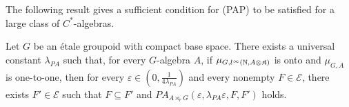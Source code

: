 
The following result gives a sufficient condition for (PAP) to be satisfied for a large class of $C^*$-algebras.

\begin{thm} \label{PAPG}
Let $G$ be an étale groupoid with compact base space. There exists a universal constant $\lambda_{PA}$ such that, for every $G$-algebra $A$, if $\mu_{G,l^\infty(\mathbb N, A\otimes\mathfrak K)}$ is onto and $\mu_{G,A}$ is one-to-one, then for every $\varepsilon \in(0,\frac{1}{4\lambda_{PA}})$ and every nonempty $F\in\mathcal E$, there exists $F'\in\mathcal E$ such that $F\subseteq F'$ and $PA_{A\rtimes_r G}(\varepsilon,\lambda_{PA}\varepsilon,F,F')$ holds.
\end{thm}

